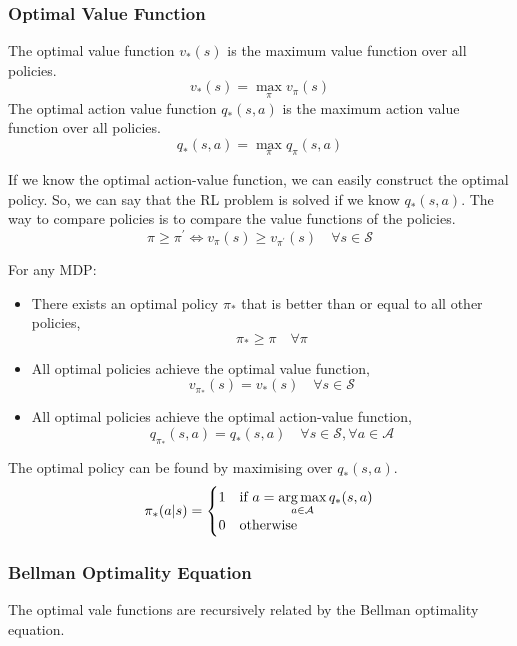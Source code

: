 \subsubsection{Optimal Value Function}
\begin{definition}
    The optimal value function \(v_{*} (s)\) is the maximum value function over all policies.
    \[
        v_{*} (s) = \max_{\pi} v_{\pi} (s)  
    \]
    The optimal action value function \(q_{*} (s, a)\) is the maximum
    action value function over all policies.
    \[
        q_{*} (s, a) = \max_{\pi} q_{\pi} (s, a)
    \]
\end{definition}
If we know the optimal action-value function, we can easily construct the optimal policy. 
So, we can say that the RL problem is solved if we know \(q_{*} (s, a)\). The way to compare
policies is to compare the value functions of the policies.
\[
    \pi \geq \pi^{\prime} \iff v_{\pi} (s) \geq v_{\pi^{\prime}} (s) \quad \forall s \in \mathcal{S}  
\]
\begin{theorem}
    For any MDP:
    \begin{itemize}
        \item There exists an optimal policy \(\pi_{*} \) that is better than or equal to all other policies,
        \[
            \pi_{*} \geq \pi \quad \forall \pi  
        \]
        \item All optimal policies achieve the optimal value function,
        \[
            v_{\pi_{*}} (s) = v_{*} (s) \quad \forall s \in \mathcal{S}  
        \]
        \item All optimal policies achieve the optimal action-value function,
        \[
            q_{\pi_{*}} (s, a) = q_{*} (s, a) \quad \forall s \in \mathcal{S} , \forall a \in \mathcal{A}  
        \]
    \end{itemize}
\end{theorem}
The optimal policy can be found by maximising over \(q_{*} (s, a)\).
\[
    \pi_{*} (a|s) = 
    \begin{cases}
        1 & \text{if } a = \operatorname*{arg\,max}\limits_{a \in \mathcal{A} } q_{*} (s, a) \\
        0 & \text{otherwise} \\
    \end{cases}
\]
\subsubsection{Bellman Optimality Equation}
The optimal vale functions are recursively related by the Bellman
optimality equation.

